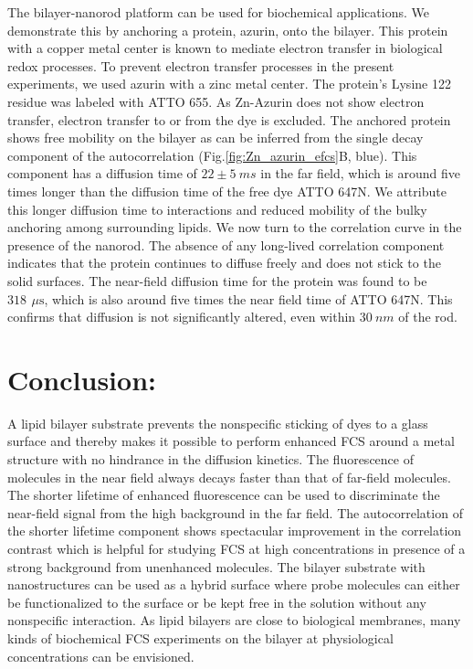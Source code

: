 \documentclass[journal=jacsat,manuscript=article]{achemso}
\newcommand{\us}{\ensuremath{\,\mu\textrm{s}}}
\begin{document}
The bilayer-nanorod platform can be used for biochemical applications. We demonstrate this by anchoring a protein, azurin, onto the bilayer. This protein with a copper metal center is known to mediate electron transfer in biological redox processes.\cite{kolczak2006azurin,Vijgenboom1997invivo} To prevent electron transfer processes in the present experiments, we used azurin with a zinc metal center. The protein's Lysine 122 residue was labeled with ATTO 655. As Zn-Azurin does not show electron transfer, electron transfer to or from the dye is excluded. The anchored protein shows free mobility on the bilayer as can be inferred from the single decay component of the autocorrelation (Fig.\ref{fig:Zn_azurin_efcs}B, blue). This component has a diffusion time of $22\pm5~ms$ in the far field, which is around five times longer than the diffusion time of the free dye ATTO 647N. We attribute this longer diffusion time to interactions and reduced mobility of the bulky anchoring among surrounding lipids. We now turn to the correlation curve in the presence of the nanorod. The absence of any long-lived correlation component indicates that the protein continues to diffuse freely and does not stick to the solid surfaces. The near-field diffusion time for the protein was found to be $318~\us$, which is also around five times the near field time of ATTO 647N. This confirms that diffusion is not significantly altered, even within $30~nm$ of the rod.
\section{Conclusion:}
A lipid bilayer substrate prevents the nonspecific sticking of dyes to a glass surface and thereby makes it possible to perform enhanced FCS around a metal structure with no hindrance in the diffusion kinetics. The fluorescence of molecules in the near field always decays faster than that of far-field molecules. The shorter lifetime of enhanced fluorescence can be used to discriminate the near-field signal from the high background in the far field. The autocorrelation of the shorter lifetime component shows spectacular improvement in the correlation contrast which is helpful for studying FCS at high concentrations in presence of a strong background from unenhanced molecules. The bilayer substrate with nanostructures can be used as a hybrid surface where probe molecules can either be functionalized to the surface or be kept free in the solution without any nonspecific interaction. As lipid bilayers are close to biological membranes, many kinds of biochemical FCS experiments on the bilayer at physiological concentrations can be envisioned.
\end{document}
